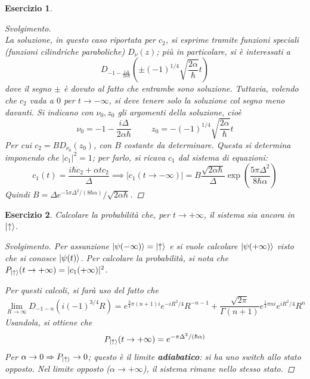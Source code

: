 \documentclass[11pt, a4paper]{scrartcl} %
\numberwithin{equation}{subsection}
\theoremstyle{style2}
\theoremstyle{style1}
\newtheorem{esercizio}{Esercizio}[section]
\renewcommand\qedsymbol{$\blacksquare$}
\newenvironment{svolgimento}{\renewcommand\qedsymbol{$\spadesuit$}\begin{proof}[Svolgimento]}{\end{proof}}
\begin{document}
\begin{esercizio}
\begin{svolgimento}
\[\] 
La soluzione, in questo caso riportata per $c_2$, si esprime tramite funzioni speciali (funzioni cilindriche paraboliche) $D_\nu (z)$; pi\`u in particolare, si \`e interessati a
\[
D_{-1-\frac{i\Delta }{2\alpha \hbar }} \left(\pm (-1)^{1 / 4}  \sqrt{\frac{2\alpha }{\hbar }} t\right) 
\] 
dove il segno $\pm$ \`e dovuto al fatto che entrambe sono soluzione. 
Tuttavia, volendo che $c_2$ vada a $0$ per $t\to -\infty$, si deve tenere solo la soluzione col segno meno davanti.
Si indicano con $\nu_0, z_0$ gli argomenti della soluzione, cio\`e 
\[
\nu_0 = -1 - \frac{i\Delta }{2\alpha \hbar } \hspace{1cm} z_0 = - (-1)^{1 / 4}  \sqrt{\frac{2\alpha }{\hbar }} t
\] 
Per cui $c_2 = B D_{\nu_0} (z_0)$, con $B $ costante da determinare.
Questa si determina imponendo che $\lvert c_1 \rvert ^2 = 1$; per farlo, si ricava $c_1$ dal sistema di equazioni:
\[
c_1(t) = \frac{i\hbar \dot{c}_2+\alpha t c_2}{\Delta }\implies \lvert c_1(t\to-\infty) \rvert = B\frac{\sqrt{2\alpha\hbar  }  }{\Delta }\exp\left(\frac{5\pi\Delta ^2}{8\hbar \alpha } \right) 
\] 
Quindi $B = \Delta e^{ - 5\pi\Delta ^2 / (8\hbar \alpha )} /\sqrt{2\alpha \hbar }  $.
	\end{svolgimento}
\end{esercizio}
\begin{esercizio}
	Calcolare la probabilit\`a che, per $t\to+\infty$, il sistema sia ancora in $\ket{\uparrow} $.
	\begin{svolgimento}
		Per assunzione $\ket{\psi (-\infty)} = \ket{\uparrow} $ e si vuole calcolare $\ket{\psi (+\infty)} $ visto che si conosce $\ket{\psi (t)} $. 
Per calcolare la probabilit\`a, si nota che $P_{\ket{\uparrow}}  (t\to+\infty) = \lvert c_1(+\infty) \rvert ^2$.

Per questi calcoli, si far\`a uso del fatto che
\[
\lim_{R \to \infty} D_{-1-n} \left(i(-1)^{3 / 4} R\right) = e^{\frac{3}{4} \pi (n+1)i} e^{ - i R^2 / 4} R^{- n - 1} +\frac{\sqrt{2\pi} }{\Gamma(n+1)}e^{\frac{1}{4}\pi n i} e^{i R^2 / 4 } R^n 
\] 
Usandola, si ottiene che
\[
P_{\ket{\uparrow} } (t\to+\infty) = e^{- \pi \Delta ^2 / (\hbar \alpha )} 
\] 
Per $\alpha \to 0 \Rightarrow  P_{\ket{\uparrow} } \to 0$; questo \`e il limite \textbf{adiabatico}: si ha uno switch allo stato opposto.
Nel limite opposto ($\alpha \to + \infty$), il sistema rimane nello stesso stato.
	\end{svolgimento}
\end{esercizio}
\end{document}
